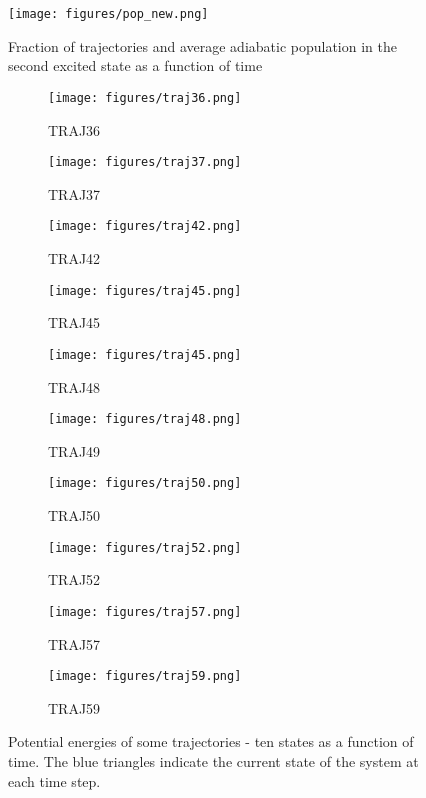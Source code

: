 \documentclass{article}
\begin{document}
\begin{figure}[h!]
    \centering
    \texttt{[image: figures/pop\_new.png]}   
    \caption{Fraction of trajectories and average adiabatic population in the second excited state as a function of time}
    \label{sps}
\end{figure}


\begin{figure}[h]
    \centering
    \begin{subfigure}{.42\textwidth}
        \texttt{[image: figures/traj36.png]}
        \caption{TRAJ36}    
    \end{subfigure}
    \begin{subfigure}{.42\textwidth}
        \texttt{[image: figures/traj37.png]}
        \caption{TRAJ37}
    \end{subfigure}
    \begin{subfigure}{.42\textwidth}
        \texttt{[image: figures/traj42.png]}
        \caption{TRAJ42}    
    \end{subfigure}
    \begin{subfigure}{.42\textwidth}
        \texttt{[image: figures/traj45.png]}
        \caption{TRAJ45}
    \end{subfigure}
        \begin{subfigure}{.42\textwidth}
        \texttt{[image: figures/traj45.png]}
        \caption{TRAJ48}    
    \end{subfigure}
    \begin{subfigure}{.42\textwidth}
        \texttt{[image: figures/traj48.png]}
        \caption{TRAJ49}
    \end{subfigure}
    \begin{subfigure}{.42\textwidth}
        \texttt{[image: figures/traj50.png]}
        \caption{TRAJ50}    
    \end{subfigure}
    \begin{subfigure}{.42\textwidth}
        \texttt{[image: figures/traj52.png]}
        \caption{TRAJ52}
    \end{subfigure}
        \begin{subfigure}{.42\textwidth}
        \texttt{[image: figures/traj57.png]}
        \caption{TRAJ57}    
    \end{subfigure}
    \begin{subfigure}{.42\textwidth}
        \texttt{[image: figures/traj59.png]}
        \caption{TRAJ59}
    \end{subfigure}
    \caption{Potential energies of some trajectories - ten states as a function of time. The blue triangles indicate the current state of the system at each time step.}
\end{figure}
\end{document}
